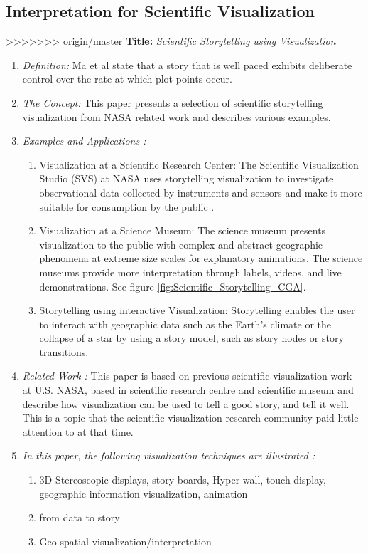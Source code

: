\documentclass{egpubl}
\begin{document}
\subsection{Interpretation for Scientific Visualization}
>>>>>>> origin/master
\textbf{Title:} \textit{Scientific Storytelling using Visualization}
\begin{enumerate}
\item \textit{Definition:} Ma et al \cite{sci} state that a story that is well paced exhibits deliberate control over the rate at which plot points occur.
\item \textit{The Concept:} This paper presents a selection of scientific storytelling visualization from NASA related work and describes various examples.
\item  \textit{Examples and Applications :} 
\begin{enumerate}
\item Visualization at a Scientific Research Center: The Scientific Visualization Studio (SVS) at NASA uses storytelling visualization to investigate observational data collected by instruments and sensors and make it more suitable for consumption by the public \cite{nasa}\cite{svs1}.
\item Visualization at a Science Museum: The science museum presents visualization to the public with complex and abstract geographic phenomena at extreme size scales for explanatory animations. The science museums provide more interpretation through labels, videos, and live demonstrations. See figure \ref{fig:Scientific_Storytelling_CGA}\cite{sci}.
\item Storytelling using interactive Visualization: Storytelling enables the user to interact with geographic data such as the Earth's climate or the collapse of a star by using a story model, such as story nodes or story transitions\cite{Akiba}.
\end{enumerate}
\item \textit{Related Work :} This paper is based on previous scientific visualization work at U.S. NASA, based in scientific research centre and scientific museum and describe how  visualization can be used to tell a good story, and tell it well. This is a topic that the scientific visualization research community paid little attention to at that time.
\item \textit{In this paper, the following visualization techniques are illustrated :} 
\begin{enumerate}
\item 3D Stereoscopic displays, story boards, Hyper-wall, touch display, geographic information visualization, animation
\item from data to story
\item Geo-spatial visualization/interpretation
\end{enumerate}
\end{enumerate}
\end{document}
